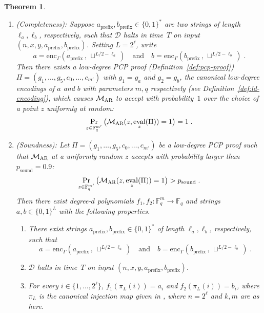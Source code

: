 \documentclass[11pt]{article}
\newtheorem{theorem}{Theorem}[section]
\theoremstyle{definition}
\newcommand{\F}{\ensuremath{\mathbb{F}}}
\newcommand{\decider}{\mathcal{D}}
\newcommand{\gamestyle}[1]{\ensuremath{\textsc{#1}}\xspace}
\newcommand{\ar}{\gamestyle{AR}}
\newcommand{\pcpverifier}{\mathcal{M}_\ar}
\DeclareMathOperator{\ev}{eval}
\newcommand{\soundness}{\mathrm{sound}}
\begin{document}
\begin{theorem}
  \begin{enumerate}
  \item[2.]
    \emph{(Completeness):} Suppose $a_{\mathrm{prefix}}, b_{\mathrm{prefix}} \in
    \{0, 1\}^*$ are two strings of length $\ell_a, \ell_b$, respectively, such
    that $\decider$ halts in time~$T$ on input $(n, x, y, a_{\mathrm{prefix}},
    b_{\mathrm{prefix}})$.
    Setting $L = 2^\ell$, write
    \begin{equation*}
      a = \mathrm{enc}_\Gamma(a_{\mathrm{prefix}}\,,\, \sqcup^{L/2 - \ell_a})
      \quad
      \text{and}
      \quad
      b = \mathrm{enc}_\Gamma(b_{\mathrm{prefix}}\,,\, \sqcup^{L/2 - \ell_b})\;.
    \end{equation*}
    Then there exists a low-degree PCP proof (Definition~\ref{def:pcp-proof})
    $\Pi = (g_1, \ldots, g_5, c_0, \ldots, c_{m'})$ with $g_1 = g_a$ and $g_2 =
    g_b$, the canonical low-degree encodings of $a$ and $b$ with parameters
    $m,q$ respectively (see Definition~\ref{def:ld-encoding}), which causes
    $\pcpverifier$ to accept with probability~$1$ over the choice of a point $z$
    uniformly at random:
    \[ \Pr_{z \in \F_q^{m'}}\big(\pcpverifier(z, \ev_{z}(\Pi)) = 1\big) = 1\;. \]
  \item[3.]
    \emph{(Soundness):} Let $\Pi = (g_1, \ldots, g_5, c_0, \ldots, c_{m'})$ be a
    low-degree PCP proof such that $\pcpverifier$ at a uniformly random $z$
    accepts with probability larger than $p_{\soundness} = 0.9$:
    \[ \Pr_{z \in \F_q^{m'}}\big( \pcpverifier(z, \ev_{z}(\Pi)) = 1\big) >
      p_{\soundness}\;. \] Then there exist degree-$d$ polynomials $f_1, f_2 :
    \F_q^m \rightarrow \F_q$ and strings $a, b \in \{0, 1\}^{L}$ with the
    following properties.
    \begin{enumerate}
    \item There exist strings $a_{\mathrm{prefix}}, b_{\mathrm{prefix}} \in \{0,
      1\}^*$ of length $\ell_a, \ell_b$, respectively, such that
      \begin{equation*}
        a = \mathrm{enc}_\Gamma(a_{\mathrm{prefix}}\,,\, \sqcup^{L/2 - \ell_a})
        \quad
        \text{and}
        \quad
        b = \mathrm{enc}_\Gamma(b_{\mathrm{prefix}}\,,\, \sqcup^{L/2 - \ell_b})\;.
      \end{equation*}
    \item $\decider$ halts in time~$T$ on input $(n, x, y, a_{\mathrm{prefix}},
      b_{\mathrm{prefix}})$.
    \item For every $i \in \{1, \dots, 2^{\ell}\}$, $f_1(\pi_L(i)) = a_i$ and
      $f_2(\pi_L(i)) = b_i$, where $\pi_L$ is the canonical injection map given
      in , where $n=2^\ell$ and $k,m$ are as here.


\end{enumerate}
\end{enumerate}
\end{theorem}
\end{document}
